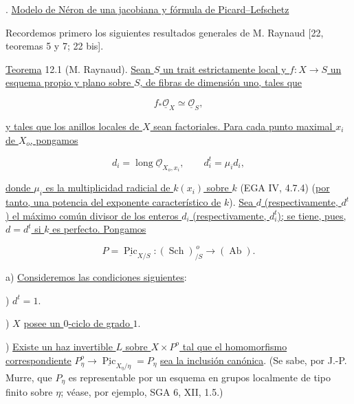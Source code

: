 

\medskip
{}. \underline{Modelo de Néron de una jacobiana y fórmula de
Picard--Lefschetz}

Recordemos primero los siguientes resultados generales de M. Raynaud
[22, teoremas 5 y 7; 22 bis].

\medskip
\noindent
\underline{Teorema} 12.1 (M. Raynaud). \underline{Sean $S$ un trait
estrictamente local y $f:X\to S$ un esquema propio y plano sobre $S$, de
fibras de dimensión uno, tales que}

\begin{equation}\tag{12.1.1}
 f_*\underline{\mathcal O}_X\simeq\underline{\mathcal O}_S,
\end{equation}

\noindent
\underline{y tales que los anillos locales de $X$ sean factoriales. Para
cada punto maximal $x_i$ de $X_o$, pongamos}

\begin{equation}\tag{12.1.2}
 d_i=\operatorname{long}\underline{\mathcal O}_{X_o,x_i},
 \qquad d_i^t=\mu_i d_i,
\end{equation}

\noindent
\underline{donde $\mu_i$ es la multiplicidad radicial de $k(x_i)$ sobre
$k$} (EGA IV, 4.7.4) (\underline{por tanto, una potencia del exponente
característico de} $k$). \underline{Sea $d$ (respectivamente, $d^t$) el máximo común
divisor de los enteros $d_i$ (respectivamente, $d_i^t$); se tiene, pues,
$d=d^t$ si $k$ es perfecto. Pongamos}

\begin{equation}\tag{12.1.3}
 P=\underline{\operatorname{Pic}}_{X/S}:
   (\operatorname{Sch})_{/S}^{\,o}\longrightarrow(\operatorname{Ab}).
\end{equation}

\noindent
a) \underline{Consideremos las condiciones siguientes}:

\smallskip
{}) $d^t=1$.

\smallskip
{}) $X$ \underline{posee un $0$-ciclo de grado $1$}.

\smallskip
{}) \underline{Existe un haz invertible $L$ sobre $X\times P^o$ tal que
el homomorfismo correspondiente}
$P^o_\eta\to\underline{\operatorname{Pic}}_{X_\eta/\eta}=P_\eta$
\underline{sea la inclusión canónica}. (Se sabe, por J.-P. Murre, que
$P_\eta$ es representable por un esquema en grupos localmente de tipo
finito sobre $\eta$; véase, por ejemplo, SGA 6, XII, 1.5.)

